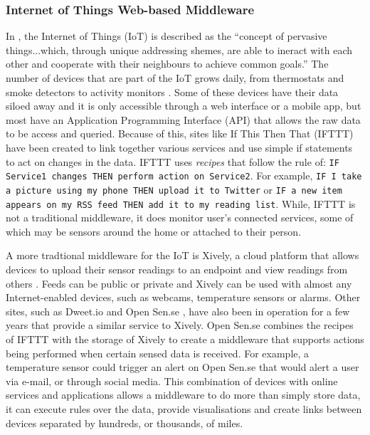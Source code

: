 	\subsubsection{Internet of Things Web-based Middleware}
		In \cite{giusto2010internet}, the Internet of Things (IoT) is described as the ``concept of pervasive things...which, through unique addressing shemes, are able to ineract with each other and cooperate with their neighbours to achieve common goals.'' The number of devices that are part of the IoT grows daily, from thermostats and smoke detectors \cite{nest} to activity monitors \cite{fitbit}. Some of these devices have their data siloed away and it is only accessible through a web interface or a mobile app, but most have an Application Programming Interface (API) that allows the raw data to be access and queried. Because of this, sites like If This Then That (IFTTT) \cite{ifttt} have been created to link together various services and use simple if statements to act on changes in the data. IFTTT uses \textit{recipes} that follow the rule of: \lstinline{IF Service1 changes THEN perform action on Service2}. For example, \lstinline{IF I take a picture using my phone THEN upload it to Twitter} or \lstinline{IF a new item appears on my RSS feed THEN add it to my reading list}. While, IFTTT is not a traditional middleware, it does monitor user's connected services, some of which may be sensors around the home or attached to their person.

		A more tradtional middleware for the IoT is Xively, a cloud platform that allows devices to upload their sensor readings to an endpoint and view readings from others \cite{xively}. Feeds can be public or private and Xively can be used with almost any Internet-enabled devices, such as webcams, temperature sensors or alarms. Other sites, such as Dweet.io \cite{dweet} and Open Sen.se \cite{opensense}, have also been in operation for a few years that provide a similar service to Xively. Open Sen.se combines the recipes of IFTTT with the storage of Xively to create a middleware that supports actions being performed when certain sensed data is received. For example, a temperature sensor could trigger an alert on Open Sen.se that would alert a user via e-mail, or through social media. This combination of devices with online services and applications allows a middleware to do more than simply store data, it can execute rules over the data, provide visualisations and create links between devices separated by hundreds, or thousands, of miles.



